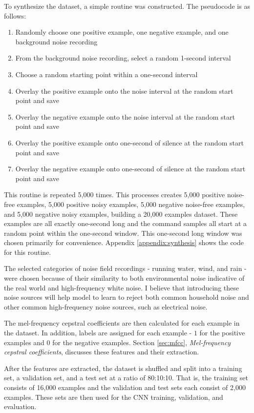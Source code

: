 \documentclass[conference]{IEEEtran}
\begin{document}
To synthesize the dataset, a simple routine was constructed. The pseudocode is as follows: 
\begin{enumerate}
    \item Randomly choose one positive example, one negative example, and one background noise recording
    \item From the background noise recording, select a random 1-second interval
    \item Choose a random starting point within a one-second interval
    \item Overlay the positive example onto the noise interval at the random start point and save
    \item Overlay the negative example onto the noise interval at the random start point and save
    \item Overlay the positive example onto one-second of silence at the random start point and save
    \item Overlay the negative example onto one-second of silence at the random start point and save
\end{enumerate}
This routine is repeated 5,000 times. 
This processes creates 5,000 positive noise-free examples,
5,000 positive noisy examples,
5,000 negative noise-free examples,
and 5,000 negative noisy examples, building a 20,000 examples dataset.
These examples are all exactly one-second long
and the command samples all start at a random point within the one-second window.
This one-second long window was chosen primarily for convenience.
Appendix \ref{appendix:synthesis} shows the code for this routine.

The selected categories of noise field recordings - running water, wind, and rain - 
were chosen because of their similarity to both 
environmental noise indicative of the real world and high-frequency white noise.
I believe that introducing these noise sources will help model to learn to reject
both common household noise and other common high-frequency noise sources,
such as electrical noise.

The mel-frequency cepstral coefficients are then calculated for each example in the dataset.
In addition, labels are assigned for each example - 
$1$ for the positive examples and $0$ for the negative examples.
Section \ref{sec:mfcc}, \textit{Mel-frequency cepstral coefficients},
discusses these features and their extraction.

After the features are extracted, the dataset is shuffled 
and split into a training set, a validation set, and a test set at a ratio of 80:10:10. 
That is, the training set consists of 16,000 examples and the validation and test sets 
each consist of 2,000 examples.
These sets are then used for the CNN training, validation, and evaluation.
\end{document}
